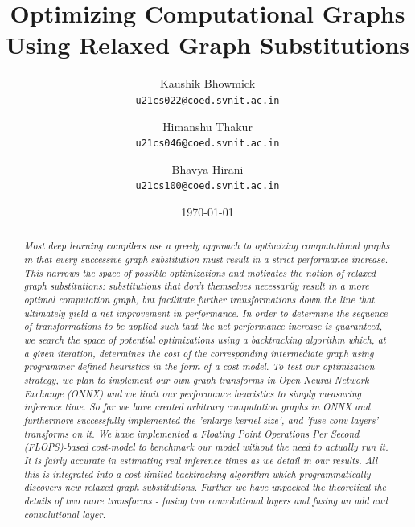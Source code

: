 \documentclass[12pt,a4paper,twoside,openright,bibliography=totocnumbered]{report}
\title{Optimizing Computational Graphs Using Relaxed Graph Substitutions}
\author{Kaushik Bhowmick\\ \texttt{u21cs022@coed.svnit.ac.in}
		\and
		Himanshu Thakur\\ \texttt{u21cs046@coed.svnit.ac.in}
		\and
		Bhavya Hirani\\ \texttt{u21cs100@coed.svnit.ac.in}
		}
\date{\today}
\begin{document}


\begin{singlespace}
\begin{footnotesize}
\begin{abstract}
\thispagestyle{plain}
\setcounter{page}{3}
	\textit{Most deep learning compilers use a greedy approach to optimizing computational graphs in that every successive graph substitution must result in a strict performance increase. This narrows the space of possible optimizations and motivates the notion of relaxed graph substitutions: substitutions that don't themselves necessarily result in a more optimal computation graph, but facilitate further transformations down the line that ultimately yield a net improvement in performance. In order to determine the sequence of transformations to be applied such that the net performance increase is guaranteed, we search the space of potential optimizations using a backtracking algorithm which, at a given iteration, determines the cost of the corresponding intermediate graph using programmer-defined heuristics in the form of a cost-model. To test our optimization strategy, we plan to implement our own graph transforms in Open Neural Network Exchange (ONNX) and we limit our performance heuristics to simply measuring inference time. So far we have created arbitrary computation graphs in ONNX and furthermore successfully implemented the 'enlarge kernel size', and 'fuse conv layers' transforms on it. We have implemented a Floating Point Operations Per Second (FLOPS)-based cost-model to benchmark our model without the need to actually run it. It is fairly accurate in estimating real inference times as we detail in our results. All this is integrated into a cost-limited backtracking algorithm which programmatically discovers new relaxed graph substitutions. Further we have unpacked the theoretical the details of two more transforms - fusing two convolutional layers and fusing an add and convolutional layer.}\\
\end{abstract}
\end{footnotesize}
\end{singlespace}
\end{document}
